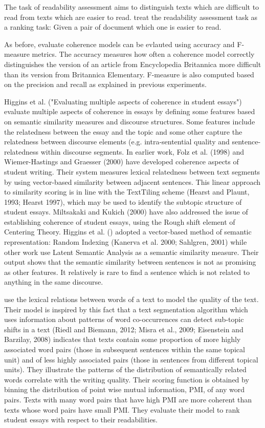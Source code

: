 The task of readability assessment aims to distinguish texts which are difficult to read from texts which are easier to read. 
 treat the readability assessment task as a ranking task: Given a pair of document which one is easier to read. 

As before,  evaluate coherence models can be evlauted using accuracy and F-measure metrics. 
The accuracy measures how often a coherence model correctly distinguishes the version of an article from Encyclopedia Britannica more difficult than its version from Britannica Elementary. 
F-measure is also computed based on the precision and recall as explained in previous experiments. 

Higgins et al. ("Evaluating multiple aspects of coherence in student essays") evaluate multiple aspects of coherence in essays by defining some features based on semantic similarity measures and discourse structures. 
Some features include the relatedness between the essay and the topic and some other capture the relatedness between discourse elements (e.g. intra-sentential quality and sentence-relatedness within discourse segments. 
In earlier work, Folz et al. (1998) and Wiemer-Hastings and Graesser (2000) have developed coherence aspects of student writing.
Their system measures lexical relatedness between text segments by using vector-based similarity between adjacent sentences.
This linear approach to similarity scoring is in line with the TextTiling scheme (Hearst and Plaunt, 1993; Hearst 1997), which may be used to identify the subtopic structure of student essays. 
Miltsakaki and Kukich (2000) have also addressed the issue of establishing coherence of student essays, using the Rough shift element of Centering Theory. 
Higgins et al. () adopted a vector-based method of semantic representation: Random Indexing (Kanerva et al. 2000; Sahlgren, 2001) while other work use Latent Semantic Analysis as a semantic similarity measure. 
Their output shows that the semantic similarity between sentences is not as promising as other features. 
It relatively is rare to find a sentence which is not related to anything in the same discourse. 

 use the lexical relations between words of a text to model the quality of the text. 
Their model is inspired by this fact that a text segmentation algorithm which uses information about patterns of word co-occurrences can detect sub-topic shifts in a text (Riedl and Biemann, 2012; Misra et al., 2009; Eisenstein and Barzilay, 2008) indicates that texts contain some proportion of more highly associated word pairs (those in subsequent sentences within the same topical unit) and of less highly associated pairs (those in sentences from different topical units). 
They illustrate the patterns of the distribution of semantically related words correlate with the writing quality. 
Their scoring function is obtained by binning the distribution of point wise mutual information, PMI, of any word pairs. 
Texts with many word pairs that have high PMI are more coherent than texts whose word pairs have small PMI. 
They evaluate their model to rank student essays with respect to their readabilities. 


